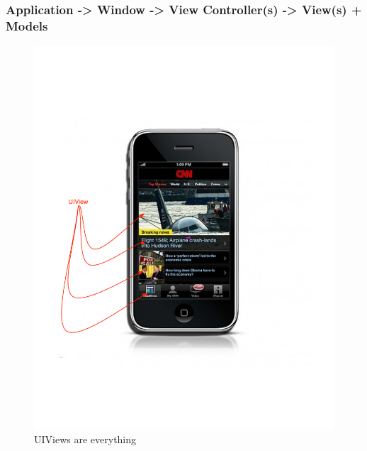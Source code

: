 \documentclass[10pt]{beamer}
\begin{document}
\begin{frame}[fragile]
  \frametitle{Application -> Window -> View Controller(s) -> View(s) + Models}
  \begin{figure}[htb]
  \begin{center}

  \includegraphics[scale=0.35]{UIViewExample.pdf}

  \caption{UIViews are everything}
  \end{center}
  \end{figure}

\end{frame}
\end{document}
